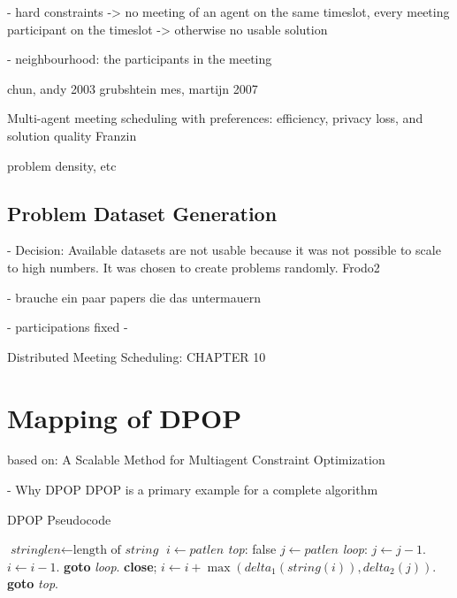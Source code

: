 \cite{Franzin}

- hard constraints -> no meeting of an agent on the same timeslot, every meeting participant on the timeslot -> otherwise no usable solution


- neighbourhood: the participants in the meeting

\cite{Chapman2011}
chun, andy 2003
grubshtein
mes, martijn 2007







Multi-agent meeting scheduling with preferences:
efficiency, privacy loss, and solution quality Franzin

problem density, etc

\subsection{Problem Dataset Generation}

- Decision: Available datasets are not usable because it was not possible to scale to high numbers. It was chosen to create problems randomly.
Frodo2

- brauche ein paar papers die das untermauern

- participations fixed
- 

Distributed Meeting Scheduling: CHAPTER 10

\section{Mapping of DPOP}

based on: A Scalable Method for Multiagent Constraint Optimization
    
    - Why DPOP
    DPOP is a primary example for a complete algorithm
   
    \begin{algorithm}
\caption{DPOP Pseudocode}\label{euclid}
\begin{algorithmic}[1]
\State $\textit{stringlen} \gets \text{length of }\textit{string}$
\State $i \gets \textit{patlen}$
\BState \emph{top}:
 \Return false
\EndIf
\State $j \gets \textit{patlen}$
\BState \emph{loop}:
\State $j \gets j-1$.
\State $i \gets i-1$.
\State \textbf{goto} \emph{loop}.
\State \textbf{close};
\EndIf
\State $i \gets i+\max(\textit{delta}_1(\textit{string}(i)),\textit{delta}_2(j))$.
\State \textbf{goto} \emph{top}.
\EndProcedure
\end{algorithmic}
\end{algorithm}

